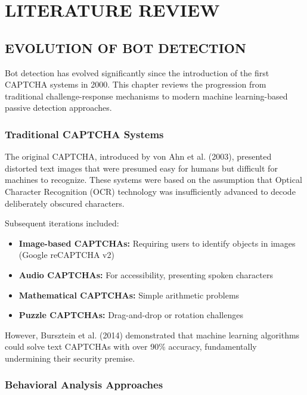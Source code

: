 
\chapter{LITERATURE REVIEW}

\section{EVOLUTION OF BOT DETECTION}

Bot detection has evolved significantly since the introduction of the first CAPTCHA systems in 2000. This chapter reviews the progression from traditional challenge-response mechanisms to modern machine learning-based passive detection approaches.

\subsection{Traditional CAPTCHA Systems}

The original CAPTCHA, introduced by von Ahn et al. (2003), presented distorted text images that were presumed easy for humans but difficult for machines to recognize. These systems were based on the assumption that Optical Character Recognition (OCR) technology was insufficiently advanced to decode deliberately obscured characters.

Subsequent iterations included:
\begin{itemize}
    \item \textbf{Image-based CAPTCHAs:} Requiring users to identify objects in images (Google reCAPTCHA v2)
    \item \textbf{Audio CAPTCHAs:} For accessibility, presenting spoken characters
    \item \textbf{Mathematical CAPTCHAs:} Simple arithmetic problems
    \item \textbf{Puzzle CAPTCHAs:} Drag-and-drop or rotation challenges
\end{itemize}

However, Bursztein et al. (2014) demonstrated that machine learning algorithms could solve text CAPTCHAs with over 90\% accuracy, fundamentally undermining their security premise.

\subsection{Behavioral Analysis Approaches}

